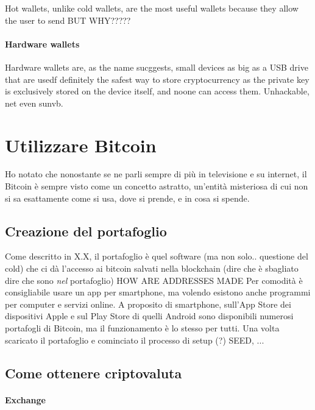 \documentclass {article}
\begin{document}
Hot wallets, unlike cold wallets, are the most useful wallets because they allow the user to send BUT WHY?????


\paragraph {Hardware wallets}


Hardware wallets are, as the name sucggests, small devices as big as a USB drive that are usedf
definitely the safest way to store cryptocurrency as the private key is exclusively stored on the device itself, and noone can access them. Unhackable, net even sunvb.


\section {Utilizzare Bitcoin}


Ho notato che nonostante se ne parli sempre di più in televisione e su internet, il Bitcoin è sempre visto come un concetto astratto, un'entità misteriosa di cui non si sa esattamente come si usa, dove si prende, e in cosa si spende.


\subsection {Creazione del portafoglio}


Come descritto in X.X, il portafoglio è quel software (ma non solo.. questione del cold) che ci dà l'accesso ai bitcoin salvati nella blockchain (dire che è sbagliato dire che sono \emph{nel} portafoglio)
HOW ARE ADDRESSES MADE
Per comodità è consigliabile usare un app per smartphone, ma volendo esistono anche programmi per computer e servizi online.
A proposito di smartphone, sull'App Store dei dispositivi Apple e sul Play Store di quelli Android sono disponibili numerosi portafogli di Bitcoin, ma il funzionamento è lo stesso per tutti.
Una volta scaricato il portafoglio e cominciato il processo di setup (?) SEED, ...


\subsection {Come ottenere criptovaluta}


\paragraph {Exchange}
\end{document}
